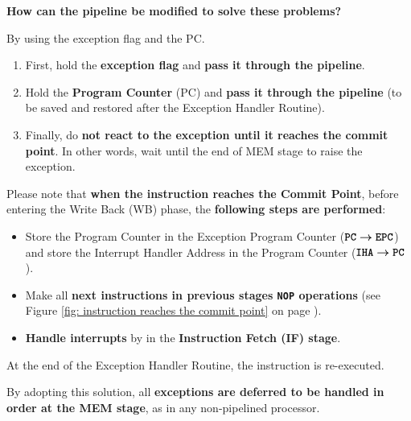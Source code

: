 \begin{flushleft}
    \textcolor{Green4}{ \textbf{How can the pipeline be modified to solve these problems?}}
\end{flushleft}
By using the exception flag and the PC.
\begin{enumerate}
    \item First, hold the \textbf{exception flag} and \textbf{pass it through the pipeline}.
    
    \item Hold the \textbf{Program Counter} (PC) and \textbf{pass it through the pipeline} (to be saved and restored after the Exception Handler Routine).
    
    \item Finally, do \textbf{not react to the exception until it reaches the commit point}. In other words, wait until the end of MEM stage to raise the exception. 
\end{enumerate}
Please note that \textbf{when the instruction reaches the Commit Point}, before entering the Write Back (WB) phase, the \textbf{following steps are performed}:
\begin{itemize}
    \item Store the Program Counter in the Exception Program Counter ($\textbf{\texttt{PC}} \boldsymbol{\rightarrow} \textbf{\texttt{EPC}}$) and store the Interrupt Handler Address in the Program Counter ($\textbf{\texttt{IHA}} \boldsymbol{\rightarrow} \textbf{\texttt{PC}}$).
    
    \item Make all \textbf{next instructions in previous stages \texttt{NOP} operations} (see Figure \ref{fig: instruction reaches the commit point} on page \pageref{fig: instruction reaches the commit point}).
    
    \item \textbf{Handle interrupts} by  in the \textbf{Instruction Fetch (IF) stage}.
\end{itemize}
At the end of the Exception Handler Routine, the instruction is re-executed.

\highspace
By adopting this solution, all \textbf{exceptions are deferred to be handled in order at the MEM stage}, as in any non-pipelined processor.

\newpage

